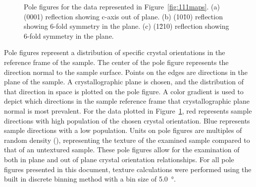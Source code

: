 \documentclass[12pt,%
              twoside,
               letterpaper]{uiothesis}
\begin{document}
\begin{figure}
		\caption[Pole figures for the data represented in Figure~\ref{fig:111maps}]{%
			Pole figures for the data represented in Figure~\ref{fig:111maps}. 
	(a) (0001) reflection showing c-axis out of plane. (b) (10\={1}0) 
	reflection showing 6-fold symmetry in the plane. (c) (1\={2}10) 
	reflection showing 6-fold symmetry in the plane.}
	\label{fig:111polefigures}
\end{figure}
Pole figures represent a distribution of specific crystal orientations in the reference
frame of the sample. The center of the pole figure represents the direction normal to the
sample surface. Points on the edges are directions in the plane of the sample. A
crystallographic plane is chosen, and the distribution of that direction in space is
plotted on the pole figure. A color gradient is used to depict which directions in the
sample reference frame that crystallographic plane normal is most prevalent. For the data
plotted in Figure~\ref{fig:111polefigures}, red represents sample directions with high
population of the chosen crystal orientation. Blue represents sample directions with a low
population. Units on pole figures are multiples of random density (), 
representing the texture of the examined sample compared to that of an untextured sample. 
These pole figures allow for the examination of both in plane and out of plane
crystal orientation relationships. For all pole figures presented in this document,
texture calculations were performed using the built in discrete binning method with a bin
size of \SI{5.0}{\degree}.
\end{document}
